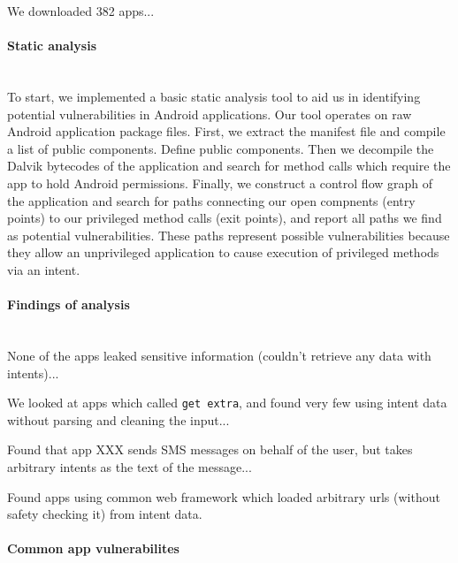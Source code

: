 \documentclass[12pt,a4paper]{article}
\begin{document}
We downloaded 382 apps...

\paragraph{Static analysis} ~\\

To start, we implemented a basic static analysis tool to aid us in identifying
potential vulnerabilities in Android applications. Our tool operates on raw Android
application package files. First, we extract the manifest file and compile a
list of public components. Define public components. Then we decompile the
Dalvik bytecodes of the application and search for method calls which require
the app to hold Android permissions. Finally, we construct a control flow graph
of the application and search for paths connecting our open compnents (entry
points) to our privileged method calls (exit points), and report all paths we
find as potential vulnerabilities. These paths represent possible
vulnerabilities because they allow an unprivileged application to cause
execution of privileged methods via an intent.

\paragraph{Findings of analysis} ~\\

None of the apps leaked sensitive information (couldn't retrieve any data with
intents)...

We looked at apps which called \texttt{get extra}, and found very few using
intent data without parsing and cleaning the input...

Found that app XXX sends SMS messages on behalf of the user, but takes arbitrary
intents as the text of the message...

Found apps using common web framework which loaded arbitrary urls (without
safety checking it) from intent data.

\paragraph{Common app vulnerabilites} ~\\
\end{document}
